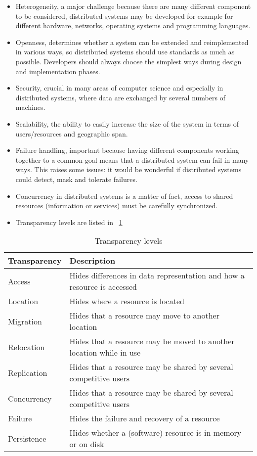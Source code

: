 \begin{itemize}
	\item Heterogeneity, a major challenge because there are many different component to be considered, distributed systems may be developed for example for different hardware, networks, operating systems and programming languages.
	\item Openness, determines whether a system can be extended and reimplemented in various ways, so distributed systems should use standards as much as possible. Developers should always choose the simplest ways during design and implementation phases.
	\item Security, crucial in many areas of computer science and especially in distributed systems, where data are exchanged by several numbers of machines.
	\item Scalability, the ability to easily increase the size of the system in terms of users/resources and geographic
	span.
	\item Failure handling, important because having different components working together to a common goal means that a distributed system can fail in many ways. This raises some issues: it would be wonderful if distributed systems could detect, mask and tolerate failures.
	\item Concurrency in distributed systems is a matter of
	fact, access to shared resources (information or services)
	must be carefully synchronized.
	\item Transparency levels are listed in \tablename~\ref{tab:transparency}
\end{itemize}

	\begin{table}[h]
		\caption{Transparency levels}
		\label{tab:transparency}
		\centering
		\begin{tabular}{lp{}}
			\toprule
			\textbf{Transparency} & \textbf{Description}\\
			\midrule
			Access & Hides differences in data representation and how a resource is accessed\\
			Location & Hides where a resource is located\\
			Migration & Hides that a resource may move to another location\\
			Relocation & Hides that a resource may be moved to another location while in use\\
			Replication & Hides that a resource may be shared by several competitive users\\
			Concurrency & Hides that a resource may be shared by several competitive users\\
			Failure & Hides the failure and recovery of a resource\\
			Persistence & Hides whether a (software) resource is in memory or on disk\\
			\bottomrule
		\end{tabular}
	\end{table}

